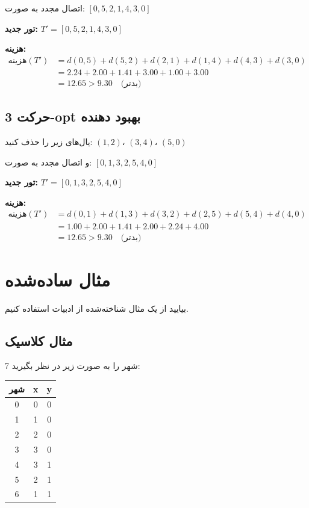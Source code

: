 \documentclass[12pt,a4paper]{article}
\begin{document}
اتصال مجدد به صورت: $[0, 5, 2, 1, 4, 3, 0]$

\textbf{تور جدید:} $T' = [0, 5, 2, 1, 4, 3, 0]$

\textbf{هزینه:}
\begin{align*}
\text{هزینه}(T') &= d(0,5) + d(5,2) + d(2,1) + d(1,4) + d(4,3) + d(3,0) \\
&= 2.24 + 2.00 + 1.41 + 3.00 + 1.00 + 3.00 \\
&= 12.65 > 9.30 \quad \text{(بدتر)}
\end{align*}

\subsection{حرکت 3-opt بهبود دهنده}

یال‌های زیر را حذف کنید: $(1,2)$، $(3,4)$، $(5,0)$

و اتصال مجدد به صورت: $[0, 1, 3, 2, 5, 4, 0]$

\textbf{تور جدید:} $T' = [0, 1, 3, 2, 5, 4, 0]$

\textbf{هزینه:}
\begin{align*}
\text{هزینه}(T') &= d(0,1) + d(1,3) + d(3,2) + d(2,5) + d(5,4) + d(4,0) \\
&= 1.00 + 2.00 + 1.41 + 2.00 + 2.24 + 4.00 \\
&= 12.65 > 9.30 \quad \text{(بدتر)}
\end{align*}

\section{مثال ساده‌شده}

بیایید از یک مثال شناخته‌شده از ادبیات استفاده کنیم.

\subsection{مثال کلاسیک}

7 شهر را به صورت زیر در نظر بگیرید:

\begin{table}[h]
\centering
\begin{tabular}{|c|c|c|}
\hline
\textbf{شهر} & \textbf{x} & \textbf{y} \\
\hline
0 & 0 & 0 \\
1 & 1 & 0 \\
2 & 2 & 0 \\
3 & 3 & 0 \\
4 & 3 & 1 \\
5 & 2 & 1 \\
6 & 1 & 1 \\
\hline
\end{tabular}
\end{table}
\end{document}
